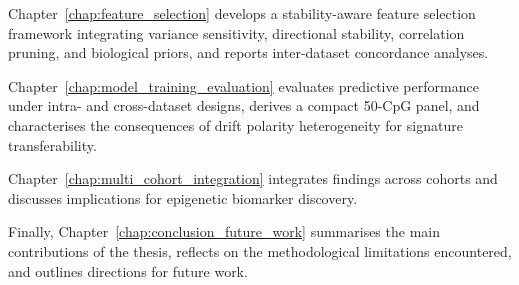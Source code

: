 Chapter~\ref{chap:feature_selection} develops a
stability-aware feature selection framework integrating
variance sensitivity, directional stability, correlation
pruning, and biological priors, and reports
inter-dataset concordance analyses.


Chapter~\ref{chap:model_training_evaluation} evaluates
predictive performance under intra- and cross-dataset
designs, derives a compact 50-CpG panel, and
characterises the consequences of drift polarity
heterogeneity for signature transferability.


Chapter~\ref{chap:multi_cohort_integration} integrates
findings across cohorts and discusses implications
for epigenetic biomarker discovery.


Finally, Chapter~\ref{chap:conclusion_future_work} summarises the
main contributions of the thesis, reflects on the
methodological limitations encountered, and outlines
directions for future work.